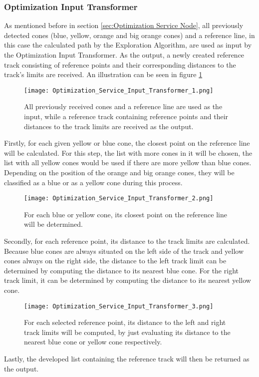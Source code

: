\subsubsection{Optimization Input Transformer} \label{sec:Optimization Input Transformer}
As mentioned before in section \ref{sec:Optimization Service Node}, all previously detected cones (blue, yellow, orange and big orange cones) and a reference line, in this case the calculated path by the Exploration Algorithm, are used as input by the Optimization Input Transformer. As the output, a newly created reference track consisting of reference points and their corresponding distances to the track's limits are received. An illustration can be seen in figure \ref{fig:Optimization Service Input Transformer 1}
\begin{figure}[H]
    \centering
    \texttt{[image: Optimization\_Service\_Input\_Transformer\_1.png]}
    \caption{All previously received cones and a reference line are used as the input, while a reference track containing reference points and their distances to the track limits are received as the output.}
    \label{fig:Optimization Service Input Transformer 1}
\end{figure}
Firstly, for each given yellow or blue cone, the closest point on the reference line will be calculated. For this step, the list with more cones in it will be chosen, the list with all yellow cones would be used if there are more yellow than blue cones. Depending on the position of the orange and big orange cones, they will be classified as a blue or as a yellow cone during this process.
\begin{figure}[H]
    \centering
    \texttt{[image: Optimization\_Service\_Input\_Transformer\_2.png]}
    \caption{For each blue or yellow cone, its closest point on the reference line will be determined.}
    \label{fig:Optimization Service Input Transformer 2}
\end{figure}
Secondly, for each reference point, its distance to the track limits are calculated. Because blue cones are always situated on the left side of the track and yellow cones always on the right side, the distance to the left track limit can be determined by computing the distance to its nearest blue cone. For the right track limit, it can be determined by computing the distance to its nearest yellow cone.
\begin{figure}[H]
    \centering
    \texttt{[image: Optimization\_Service\_Input\_Transformer\_3.png]}
    \caption{For each selected reference point, its distance to the left and right track limits will be computed, by just evaluating its distance to the nearest blue cone or yellow cone respectively.}
    \label{fig:Optimization Service Input Transformer 3}
\end{figure}
Lastly, the developed list containing the reference track will then be returned as the output.

